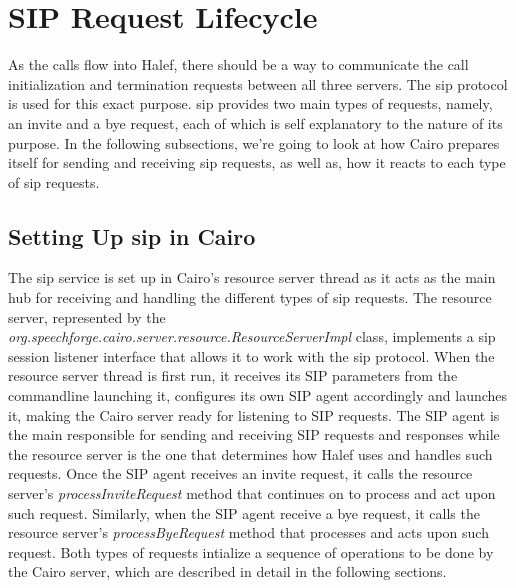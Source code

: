 
\section{SIP Request Lifecycle}
As the calls flow into Halef, there should be a way to communicate the call initialization and termination requests between all three servers.
The \ac{sip} protocol is used for this exact purpose.
\ac{sip} provides two main types of requests, namely, an invite and a bye request, each of which is self explanatory to the nature of its purpose.
In the following subsections, we're going to look at how Cairo prepares itself for sending and receiving \ac{sip} requests, as well as, how it reacts to each type of \ac{sip} requests.

\subsection{Setting Up \ac{sip} in Cairo}
The \ac{sip} service is set up in Cairo's resource server thread as it acts as the main hub for receiving and handling the different types of \ac{sip} requests.
The resource server, represented by the \textit{org.speechforge.cairo.server.resource.ResourceServerImpl} class, implements a \ac{sip} session listener interface that allows it to work with the \ac{sip} protocol.
When the resource server thread is first run, it receives its SIP parameters from the commandline launching it, configures its own SIP agent accordingly and launches it, making the Cairo server ready for listening to SIP requests.
The SIP agent is the main responsible for sending and receiving SIP requests and responses while the resource server is the one that determines how Halef uses and handles such requests.
Once the SIP agent receives an invite request, it calls the resource server's \textit{processInviteRequest} method that continues on to process and act upon such request.
Similarly, when the SIP agent receive a bye request, it calls the resource server's \textit{processByeRequest} method that processes and acts upon such request.
Both types of requests intialize a sequence of operations to be done by the Cairo server, which are described in detail in the following sections.

